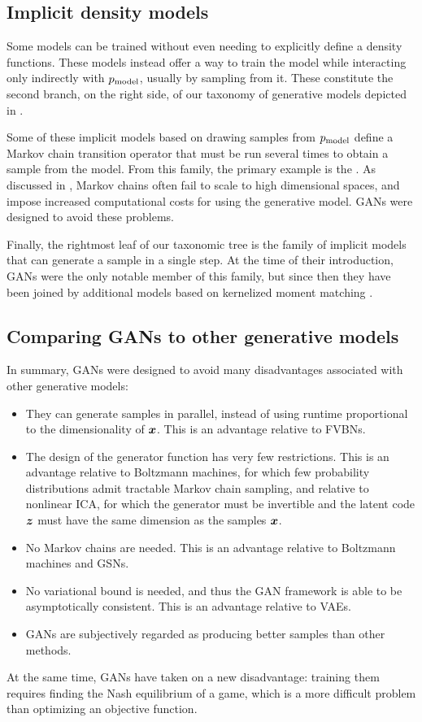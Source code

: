 \subsection{Implicit density models}

Some models can be trained without even needing to explicitly define a density
functions.
These models instead offer a way to train the model while interacting only
indirectly with $p_{\rm{model}}$, usually by sampling from it.
These constitute the second branch, on the right side, of our taxonomy of
generative models depicted in .

Some of these implicit models based on drawing samples from $p_{\rm{model}}$ define
a Markov chain transition operator that must be run several times to obtain
 a sample from the model.
From this family, the primary example is the 
\citep{Bengio-et-al-ICML-2014}.
As discussed in , Markov chains often fail to scale to high
dimensional spaces, and impose increased computational costs for using the
generative model. GANs were designed to avoid these problems.

Finally, the rightmost leaf of our taxonomic tree is the family of implicit models
that can generate a sample in a single step.
At the time of their introduction, GANs were the only notable member of this family,
but since then they have been joined by additional models based on
kernelized moment matching \citep{Li-et-al-2015,dziugaite2015training}.

\subsection{Comparing GANs to other generative models}

In summary, GANs were designed to avoid many disadvantages associated with other generative
models:
\begin{itemize}
  \item They can generate samples in parallel, instead of using runtime proportional to the
    dimensionality of ${\bm{x}}$. This is an advantage relative to FVBNs.
  \item The design of the generator function has very few restrictions. This is an advantage
    relative to Boltzmann machines, for which few probability distributions admit tractable
    Markov chain sampling, and relative to nonlinear ICA, for which the generator must be
    invertible and the latent code ${\bm{z}}$ must have the same dimension as the samples
    ${\bm{x}}$.
  \item No Markov chains are needed. This is an advantage relative to Boltzmann machines and GSNs.
  \item No variational bound is needed, and thus the GAN framework is able to be asymptotically
    consistent. This is an advantage relative to VAEs.
  \item GANs are subjectively regarded as producing better samples than other methods.
\end{itemize}
At the same time, GANs have taken on a new disadvantage: training them requires finding
the Nash equilibrium of a game, which is a more difficult problem than optimizing an
objective function.
